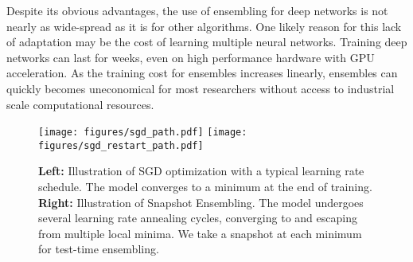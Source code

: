 Despite its obvious advantages, the use of ensembling for deep networks is not nearly as wide-spread as it is for other algorithms.
One likely reason for this lack of adaptation may be the cost of learning multiple neural networks.
Training deep networks can last for weeks, even on high performance hardware with GPU acceleration.
As the training cost for ensembles increases linearly, ensembles can quickly becomes uneconomical for most researchers without access to industrial scale computational resources.




\begin{figure*}[t!]
\vspace{-2ex}
  \centerline{
  \texttt{[image: figures/sgd\_path.pdf]}
    \texttt{[image: figures/sgd\_restart\_path.pdf]}
  }

  \caption{\small{\bf Left:} Illustration of SGD optimization with a typical learning rate schedule. The model converges to a minimum at the end of training. {\bf Right:} Illustration of Snapshot Ensembling. The model undergoes several learning rate annealing cycles, converging to and escaping from multiple local minima. We take a snapshot at each minimum for test-time ensembling.}
  \label{fig:paths}
\end{figure*}

